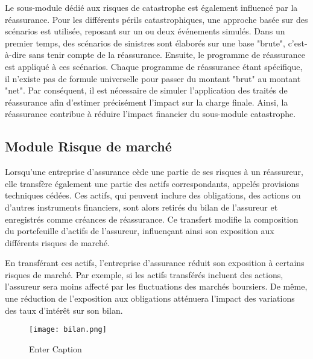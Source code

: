 Le sous-module dédié aux risques de catastrophe est également influencé par la réassurance. Pour les différents périls catastrophiques, une approche basée sur des scénarios est utilisée, reposant sur un ou deux événements simulés. 
Dans un premier temps, des scénarios de sinistres sont élaborés sur une base "brute", c'est-à-dire sans tenir compte de la réassurance. Ensuite, le programme de réassurance est appliqué à ces scénarios. Chaque programme de réassurance étant spécifique, il n'existe pas de formule universelle pour passer du montant "brut" au montant "net". Par conséquent, il est nécessaire de simuler l'application des traités de réassurance afin d'estimer précisément l'impact sur la charge finale. Ainsi, la réassurance contribue à réduire l'impact financier du sous-module catastrophe.

\subsection*{Module Risque de marché}

Lorsqu'une entreprise d'assurance cède une partie de ses risques à un réassureur, elle transfère également une partie des actifs correspondants, appelés provisions techniques cédées. Ces actifs, qui peuvent inclure des obligations, des actions ou d'autres instruments financiers, sont alors retirés du bilan de l'assureur et enregistrés comme créances de réassurance. Ce transfert modifie la composition du portefeuille d'actifs de l'assureur, influençant ainsi son exposition aux différents risques de marché.

En transférant ces actifs, l'entreprise d'assurance réduit son exposition à certains risques de marché. Par exemple, si les actifs transférés incluent des actions, l'assureur sera moins affecté par les fluctuations des marchés boursiers. De même, une réduction de l'exposition aux obligations atténuera l'impact des variations des taux d'intérêt sur son bilan.

\begin{figure}[h]
    \centering
    \texttt{[image: bilan.png]}
    \caption{Enter Caption}
    \label{fig:enter-label}
\end{figure}

